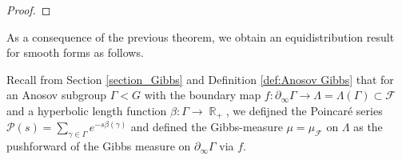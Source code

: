 \documentclass[12pt]{amsbook}%
\theoremstyle{definition}
\theoremstyle{remark}
\numberwithin{section}{chapter}
\numberwithin{subsection}{section}
\numberwithin{figure}{chapter}
\DeclareMathOperator{\Th}{Th}
\DeclareMathOperator{\R}{\mathbb{R}}
\def\cF{{\mathscr{F}}}
\def\cP{{\mathscr{P}}}
\def\Ga{\Gamma}
\def\La{\Lambda}
\def\geo{\partial_\infty}
\begin{document}
{{\begin{proof}
 \end{proof}


As a consequence of the previous theorem, we obtain an equidistribution result for smooth forms as follows.

 Recall from Section \ref{section_Gibbs} and Definition \ref{def:Anosov Gibbs} 
 that for an Anosov subgroup $\Gamma< G$ with the boundary map $f: \geo \Ga\to \La=\La(\Ga)\subset \cF$ 
 and a hyperbolic length function $\beta \colon \Gamma \to \R_+$, we defijned the Poincar\'e series  $\cP(s) = \sum_{\gamma \in \Gamma} e^{-s \beta(\gamma)}$ and defined the Gibbs-measure $\mu=\mu_{\cF}$ on $\La$  as the pushforward of the Gibbs measure on $\geo \Ga$ via  $f$.  

}}
\end{document}
